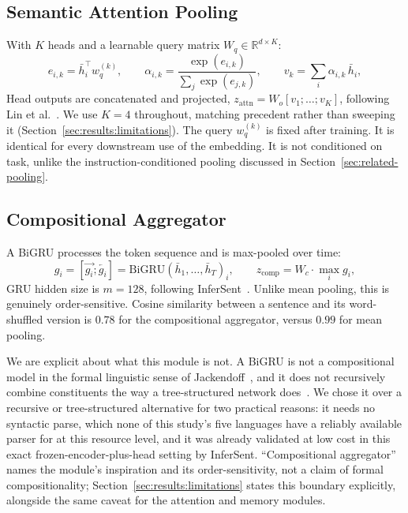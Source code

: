 \documentclass[manuscript]{acmart}
\begin{document}
\subsection{Semantic Attention Pooling}

With $K$ heads and a learnable query matrix $W_q \in \mathbb{R}^{d \times K}$:
\begin{equation}
e_{i,k} = \bar h_i^\top w_q^{(k)}, \qquad
\alpha_{i,k} = \frac{\exp(e_{i,k})}{\sum_j \exp(e_{j,k})}, \qquad
v_k = \sum_i \alpha_{i,k}\, \bar h_i,
\label{eq:attn}
\end{equation}
Head outputs are concatenated and projected, $z_{\text{attn}} = W_o[v_1;\ldots;v_K]$, following Lin et al.~\citep{lin2017structured}. We use $K=4$ throughout, matching precedent rather than sweeping it (Section~\ref{sec:results:limitations}). The query $w_q^{(k)}$ is fixed after training. It is identical for every downstream use of the embedding. It is not conditioned on task, unlike the instruction-conditioned pooling discussed in Section~\ref{sec:related-pooling}.

\subsection{Compositional Aggregator}

A BiGRU processes the token sequence and is max-pooled over time:
\begin{equation}
g_i = [\overrightarrow{g_i}; \overleftarrow{g_i}] = \text{BiGRU}(\bar h_1,\ldots,\bar h_T)_i, \qquad
z_{\text{comp}} = W_c \cdot \max_i g_i,
\label{eq:comp}
\end{equation}
GRU hidden size is $m=128$, following InferSent~\citep{conneau2017infersent}. Unlike mean pooling, this is genuinely order-sensitive. Cosine similarity between a sentence and its word-shuffled version is $0.78$ for the compositional aggregator, versus $0.99$ for mean pooling.

We are explicit about what this module is not. A BiGRU is not a compositional model in the formal linguistic sense of Jackendoff~\citep{jackendoff2002foundations}, and it does not recursively combine constituents the way a tree-structured network does~\citep{socher2013recursive}. We chose it over a recursive or tree-structured alternative for two practical reasons: it needs no syntactic parse, which none of this study's five languages have a reliably available parser for at this resource level, and it was already validated at low cost in this exact frozen-encoder-plus-head setting by InferSent. ``Compositional aggregator'' names the module's inspiration and its order-sensitivity, not a claim of formal compositionality; Section~\ref{sec:results:limitations} states this boundary explicitly, alongside the same caveat for the attention and memory modules.
\end{document}
